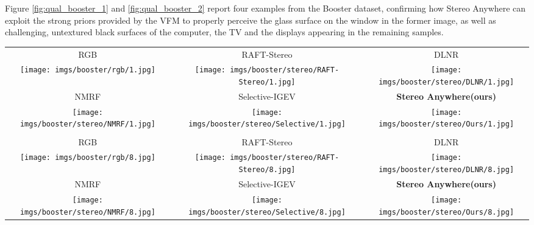 \documentclass[10pt,twocolumn,letterpaper]{article}
\newcommand{\method}[0]{Stereo Anywhere\xspace}
\begin{document}
\clearpage

Figure \ref{fig:qual_booster_1} and \ref{fig:qual_booster_2} report four examples from the Booster dataset, confirming how \method can exploit the strong priors provided by the VFM to properly perceive the glass surface on the window in the former image, as well as challenging, untextured black surfaces of the computer, the TV and the displays appearing in the remaining samples.

\begin{figure*}[h]
    \centering
    \renewcommand{\tabcolsep}{1pt}
    \begin{tabular}{ccc}
        \small RGB &
        \small RAFT-Stereo \cite{lipson2021raft} &
        \small DLNR \cite{zhao2023high} \\
        \texttt{[image: imgs/booster/rgb/1.jpg]} &
        \texttt{[image: imgs/booster/stereo/RAFT-Stereo/1.jpg]} &
        \texttt{[image: imgs/booster/stereo/DLNR/1.jpg]} \\
        \small NMRF \cite{guan2024neural} &
        \small Selective-IGEV \cite{wang2024selective} &
        \textbf{\method (ours)} \\
        \texttt{[image: imgs/booster/stereo/NMRF/1.jpg]} &
        \texttt{[image: imgs/booster/stereo/Selective/1.jpg]} &
        \texttt{[image: imgs/booster/stereo/Ours/1.jpg]} \\ \\
        \small RGB &
        \small RAFT-Stereo \cite{lipson2021raft} &
        \small DLNR \cite{zhao2023high} \\
        \texttt{[image: imgs/booster/rgb/8.jpg]} &
        \texttt{[image: imgs/booster/stereo/RAFT-Stereo/8.jpg]} &
        \texttt{[image: imgs/booster/stereo/DLNR/8.jpg]} \\
        \small NMRF \cite{guan2024neural} &
        \small Selective-IGEV \cite{wang2024selective} &
        \textbf{\method (ours)} \\
        \texttt{[image: imgs/booster/stereo/NMRF/8.jpg]} &
        \texttt{[image: imgs/booster/stereo/Selective/8.jpg]} &
        \texttt{[image: imgs/booster/stereo/Ours/8.jpg]} \\
    \end{tabular}

    \caption{\textbf{Qualitative Results -- Booster (part 1).} Predictions by state-of-the-art models and \method.}
    \label{fig:qual_booster_1}\vspace{-0.3cm}

\end{figure*}
\end{document}
